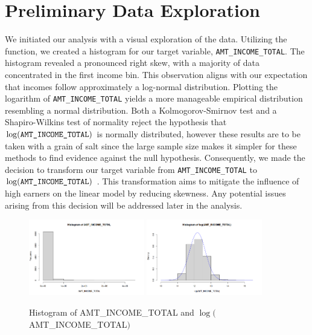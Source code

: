 \documentclass[hidelinks,12pt]{article}
\newcommand{\inlinecode}[1]{%
    \tikz[baseline=(text.base)]{
        \node[inner sep=2pt, fill=gray!15, rounded corners, font=\ttfamily](text){#1};
    }%
}
\begin{document}
\section{Preliminary Data Exploration}
We initiated our analysis with a visual exploration of the data. Utilizing the \inlinecode{hist()} function, we created a histogram for our target variable, \verb|AMT_INCOME_TOTAL|. The histogram revealed a pronounced right skew, with a majority of data concentrated in the first income bin. This observation aligns with our expectation that incomes follow approximately a log-normal distribution. Plotting the logarithm of \verb|AMT_INCOME_TOTAL| yields a more manageable empirical distribution resembling a normal distribution. Both a Kolmogorov-Smirnov test and a Shapiro-Wilkins test of normality reject the hypothesis that $\log(\verb|AMT_INCOME_TOTAL|)$ is normally distributed, however these results are to be taken with a grain of salt since the large sample size makes it simpler for these methods to find evidence against the null hypothesis. Consequently, we made the decision to transform our target variable from \verb|AMT_INCOME_TOTAL| to $\log(\verb|AMT_INCOME_TOTAL|)$ \cite{West2022-zj}. This transformation aims to mitigate the influence of high earners on the linear model by reducing skewness. Any potential issues arising from this decision will be addressed later in the analysis.
\begin{figure}[h]
  \begin{center}
  \includegraphics[width=0.45\textwidth]{img/83b37f62-d6f5-4e84-a7da-80b36e664b55.png}
  \includegraphics[width=0.45\textwidth]{img/c3b5fc12-a0e0-45e1-808b-eaa610e5e5ec.png}
\end{center}
\caption{Histogram of AMT\_INCOME\_TOTAL and $\log($AMT\_INCOME\_TOTAL$)$}
\end{figure}\\
\end{document}
